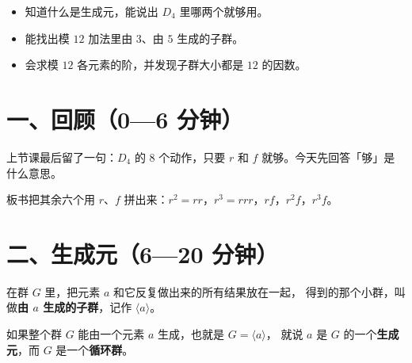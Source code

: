

\begin{mubiao}
  \begin{itemize}
    \item 知道什么是生成元，能说出 \(D_4\) 里哪两个就够用。
    \item 能找出模 \(12\) 加法里由 \(3\)、由 \(5\) 生成的子群。
    \item 会求模 \(12\) 各元素的阶，并发现子群大小都是 \(12\) 的因数。
  \end{itemize}
\end{mubiao}


\section*{一、回顾（0—6 分钟）}

上节课最后留了一句：\(D_4\) 的 \(8\) 个动作，只要 \(r\) 和 \(f\) 就够。今天先回答「够」是什么意思。

板书把其余六个用 \(r\)、\(f\) 拼出来：\(r^2=rr\)，\(r^3=rrr\)，\(rf\)，\(r^2f\)，\(r^3f\)。

\section*{二、生成元（6—20 分钟）}

\begin{definition}[由 \(a\) 生成的子群]
  在群 \(G\) 里，把元素 \(a\) 和它反复做出来的所有结果放在一起，
  得到的那个小群，叫做\textbf{由 \(a\) 生成的子群}，记作 \(\langle a\rangle\)。
\end{definition}

\begin{definition}
  如果整个群 \(G\) 能由一个元素 \(a\) 生成，也就是 \(G=\langle a\rangle\)，
  就说 \(a\) 是 \(G\) 的一个\textbf{生成元}，而 \(G\) 是一个\textbf{循环群}。
\end{definition}

